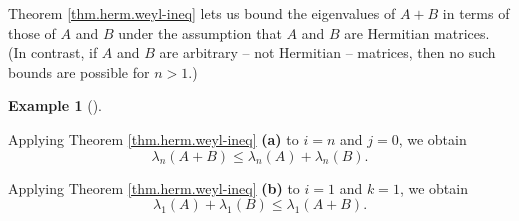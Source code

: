 \documentclass[numbers=enddot,12pt,final,onecolumn,notitlepage]{scrartcl}%
\numberwithin{exer}{subsection}
\theoremstyle{definition}
\newtheorem{exam}[theo]{Example}
\newenvironment{example}[1][]
{\begin{exam}[#1]\begin{leftbar}}
{\end{leftbar}\end{exam}}
\begin{document}
Theorem \ref{thm.herm.weyl-ineq} lets us bound the eigenvalues of $A+B$ in
terms of those of $A$ and $B$ under the assumption that $A$ and $B$ are
Hermitian matrices. (In contrast, if $A$ and $B$ are arbitrary -- not
Hermitian -- matrices, then no such bounds are possible for $n>1$.)

\begin{example}
Applying Theorem \ref{thm.herm.weyl-ineq} \textbf{(a)} to $i=n$ and $j=0$, we
obtain%
\[
\lambda_{n}\left(  A+B\right)  \leq\lambda_{n}\left(  A\right)  +\lambda
_{n}\left(  B\right)  .
\]


Applying Theorem \ref{thm.herm.weyl-ineq} \textbf{(b)} to $i=1$ and $k=1$, we
obtain%
\[
\lambda_{1}\left(  A\right)  +\lambda_{1}\left(  B\right)  \leq\lambda
_{1}\left(  A+B\right)  .
\]

\end{example}
\end{document}
